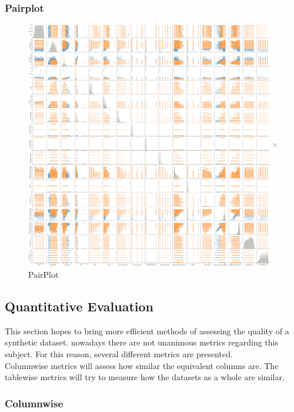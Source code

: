 \documentclass{article}
\begin{document}
\subsubsection{Pairplot}

\begin{figure}[H]
\centering
\includegraphics[width=\textwidth]{pairplot}
\caption{PairPlot}
\label{fig:pairplot}
\end{figure}
  
\subsection{Quantitative Evaluation}\label{sec:quant}
This section hopes to bring more efficient methods of assessing the quality of a synthetic dataset. nowadays there are not unanimous metrics regarding this subject. For this reason, several different metrics are presented.\\
Columnwise metrics will assess how similar the equivalent columns are. The tablewise metrics will try to measure how the datasets as a whole are similar.
\subsubsection{Columnwise}
  
\end{document}
